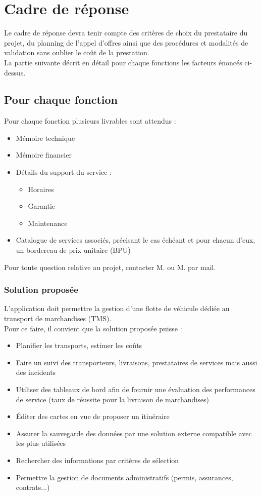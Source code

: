 \chapter{Cadre de réponse}
Le cadre de réponse devra tenir compte des critères de choix du prestataire du projet, du planning de l'appel d'offres ainsi que des procédures et modalités de validation sans oublier le coût de la prestation.
\\
La partie suivante décrit en détail pour chaque fonctions les facteurs énoncés ci-dessus.

\section{Pour chaque fonction}
Pour chaque fonction plusieurs livrables sont attendus :\\
\begin{itemize}
 \item Mémoire technique
 \item Mémoire financier
 \item Détails du support du service :
 \begin{itemize}
  \item Horaires
  \item Garantie
 \item Maintenance
 \end{itemize}
 \item Catalogue de services associés, précisant le cas échéant et pour chacun d'eux, un bordereau de prix unitaire (BPU)
\end{itemize}
Pour toute question relative au projet, contacter M. \mj ou M. \roland par mail.

\subsection{Solution proposée}
L'application doit permettre la gestion d'une flotte de véhicule dédiée au transport de marchandises (TMS).
\\
Pour ce faire, il convient que la solution proposée puisse :
\begin{itemize}
 \item Planifier les transports, estimer les coûts
 \item Faire un suivi des transporteurs, livraisons, prestataires de services mais aussi des incidents
 \item Utiliser des tableaux de bord afin de fournir une évaluation des performances de service (taux  de réussite pour la livraison de marchandises)
 \item Éditer des cartes en vue de proposer un itinéraire
 \item Assurer la sauvegarde des données par une solution externe compatible avec les plus utilisées
 \item Rechercher des informations par critères de sélection
 \item Permettre la gestion de documents administratifs (permis, assurances, contrats...)
\end{itemize}

